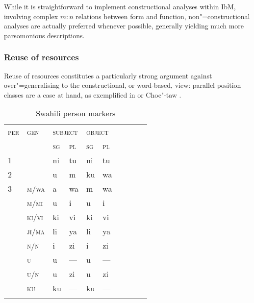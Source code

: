 \documentclass[output=paper
 	        ,biblatex
                ,babelshorthands
                ,newtxmath
                ,draftmode
                ,colorlinks, citecolor=brown
]{langscibook}
\begin{document}
\begin{exe}
\begin{xlist}
\begin{exe}
\begin{xlist}
While it is straightforward to implement constructional analyses
within IbM, involving complex $m:n$ relations between form and
function, non"=constructional analyses are actually preferred whenever
possible, generally yielding much more parsomonious descriptions.

\subsubsection{Reuse of resources}

Reuse of resources constitutes a particularly strong argument
against over"=generalising to the constructional, or word-based, view: parallel
position classes are a case at hand, as exemplified in 
\citep{Stump93,Crysmann:Bonami:2016} or Choc"-taw \citep{broadwell:2017}. 

\begin{table}[hbt]
  \centering
  \small
  \begin{tabular}{llllllllll}
    \lsptoprule
    \textsc{per} & \textsc{gen} & \multicolumn{2}{l}{\textsc{subject}} &
                                                                         \multicolumn{2}{l}{\textsc{object}}\\%
                 & & \textsc{sg} & \textsc{pl} & \textsc{sg} & \textsc{pl}\\%
    \midrule
    1	&       & ni & tu  & ni & tu\\%
    2	&       & u	 & m   & ku & wa\\%
    3	& \textsc{m/wa}  & a	 & wa  & m  & wa\\%
                 & \textsc{m/mi}	& u  & i   & u  & i \\%
                 & \textsc{ki/vi}	& ki & vi  & ki & vi \\%
                 & \textsc{ji/ma} & li & ya  & li & ya \\%
                 & \textsc{n/n} & i    & zi  & i  & zi \\%
                 & \textsc{u}     & u  & --- & u  & --- \\%
                 & \textsc{u/n}   & u  & zi  & u  & zi  \\%
                 & \textsc{ku}    & ku & --- & ku & --- \\%
    \lspbottomrule
\end{tabular}
  \caption{Swahili person markers \citep[143]{Stump93}} \label{ex:SwaPer} 


\end{table}
\end{xlist}
\end{exe}
\end{xlist}
\end{exe}
\end{document}
